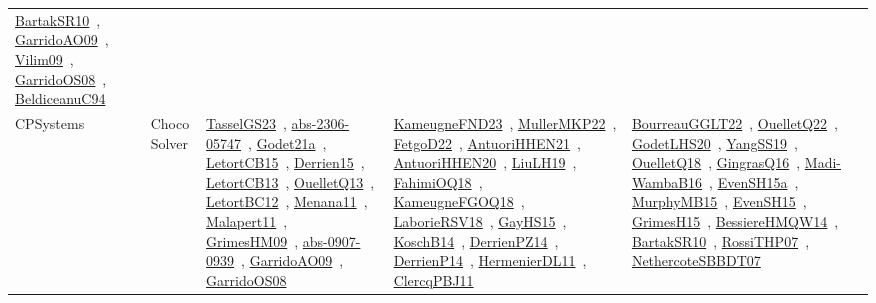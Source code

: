 {\begin{longtable}{lp{3cm}>{\raggedright\arraybackslash}p{6cm}>{\raggedright\arraybackslash}p{6cm}>{\raggedright\arraybackslash}p{8cm}}
\href{works/BartakSR10.pdf}{BartakSR10}~\cite{BartakSR10}, \href{works/GarridoAO09.pdf}{GarridoAO09}~\cite{GarridoAO09}, \href{works/Vilim09.pdf}{Vilim09}~\cite{Vilim09}, \href{works/GarridoOS08.pdf}{GarridoOS08}~\cite{GarridoOS08}, \href{works/BeldiceanuC94.pdf}{BeldiceanuC94}~\cite{BeldiceanuC94}\\
CPSystems & Choco Solver & \href{works/TasselGS23.pdf}{TasselGS23}~\cite{TasselGS23}, \href{works/abs-2306-05747.pdf}{abs-2306-05747}~\cite{abs-2306-05747}, \href{works/Godet21a.pdf}{Godet21a}~\cite{Godet21a}, \href{works/LetortCB15.pdf}{LetortCB15}~\cite{LetortCB15}, \href{works/Derrien15.pdf}{Derrien15}~\cite{Derrien15}, \href{works/LetortCB13.pdf}{LetortCB13}~\cite{LetortCB13}, \href{works/OuelletQ13.pdf}{OuelletQ13}~\cite{OuelletQ13}, \href{works/LetortBC12.pdf}{LetortBC12}~\cite{LetortBC12}, \href{works/Menana11.pdf}{Menana11}~\cite{Menana11}, \href{works/Malapert11.pdf}{Malapert11}~\cite{Malapert11}, \href{works/GrimesHM09.pdf}{GrimesHM09}~\cite{GrimesHM09}, \href{works/abs-0907-0939.pdf}{abs-0907-0939}~\cite{abs-0907-0939}, \href{works/GarridoAO09.pdf}{GarridoAO09}~\cite{GarridoAO09}, \href{works/GarridoOS08.pdf}{GarridoOS08}~\cite{GarridoOS08} & \href{works/KameugneFND23.pdf}{KameugneFND23}~\cite{KameugneFND23}, \href{works/MullerMKP22.pdf}{MullerMKP22}~\cite{MullerMKP22}, \href{works/FetgoD22.pdf}{FetgoD22}~\cite{FetgoD22}, \href{works/AntuoriHHEN21.pdf}{AntuoriHHEN21}~\cite{AntuoriHHEN21}, \href{works/AntuoriHHEN20.pdf}{AntuoriHHEN20}~\cite{AntuoriHHEN20}, \href{works/LiuLH19.pdf}{LiuLH19}~\cite{LiuLH19}, \href{works/FahimiOQ18.pdf}{FahimiOQ18}~\cite{FahimiOQ18}, \href{works/KameugneFGOQ18.pdf}{KameugneFGOQ18}~\cite{KameugneFGOQ18}, \href{works/LaborieRSV18.pdf}{LaborieRSV18}~\cite{LaborieRSV18}, \href{works/GayHS15.pdf}{GayHS15}~\cite{GayHS15}, \href{works/KoschB14.pdf}{KoschB14}~\cite{KoschB14}, \href{works/DerrienPZ14.pdf}{DerrienPZ14}~\cite{DerrienPZ14}, \href{works/DerrienP14.pdf}{DerrienP14}~\cite{DerrienP14}, \href{works/HermenierDL11.pdf}{HermenierDL11}~\cite{HermenierDL11}, \href{works/ClercqPBJ11.pdf}{ClercqPBJ11}~\cite{ClercqPBJ11} & \href{works/BourreauGGLT22.pdf}{BourreauGGLT22}~\cite{BourreauGGLT22}, \href{works/OuelletQ22.pdf}{OuelletQ22}~\cite{OuelletQ22}, \href{works/GodetLHS20.pdf}{GodetLHS20}~\cite{GodetLHS20}, \href{works/YangSS19.pdf}{YangSS19}~\cite{YangSS19}, \href{works/OuelletQ18.pdf}{OuelletQ18}~\cite{OuelletQ18}, \href{works/GingrasQ16.pdf}{GingrasQ16}~\cite{GingrasQ16}, \href{works/Madi-WambaB16.pdf}{Madi-WambaB16}~\cite{Madi-WambaB16}, \href{works/EvenSH15a.pdf}{EvenSH15a}~\cite{EvenSH15a}, \href{works/MurphyMB15.pdf}{MurphyMB15}~\cite{MurphyMB15}, \href{works/EvenSH15.pdf}{EvenSH15}~\cite{EvenSH15}, \href{works/GrimesH15.pdf}{GrimesH15}~\cite{GrimesH15}, \href{works/BessiereHMQW14.pdf}{BessiereHMQW14}~\cite{BessiereHMQW14}, \href{works/BartakSR10.pdf}{BartakSR10}~\cite{BartakSR10}, \href{works/RossiTHP07.pdf}{RossiTHP07}~\cite{RossiTHP07}, \href{works/NethercoteSBBDT07.pdf}{NethercoteSBBDT07}~\cite{NethercoteSBBDT07}\\

\end{longtable}}
